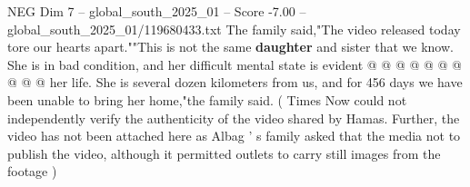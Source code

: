 \begin{textsample}{NEG Dim 7 – global\_south\_2025\_01 – Score -7.00 – global\_south\_2025\_01/119680433.txt}
The family said,"The video released today tore our hearts apart.""This is not the same \textbf{daughter} and sister that we know.
She is in bad condition, and her difficult mental state is evident @ @ @ @ @ @ @ @ @ @ her life.
She is several dozen kilometers from us, and for 456 days we have been unable to bring her home,"the family said. ( Times Now could not independently verify the authenticity of the video shared by Hamas.
Further, the video has not been attached here as Albag ' s family asked that the media not to publish the video, although it permitted outlets to carry still images from the footage )

\end{textsample}
